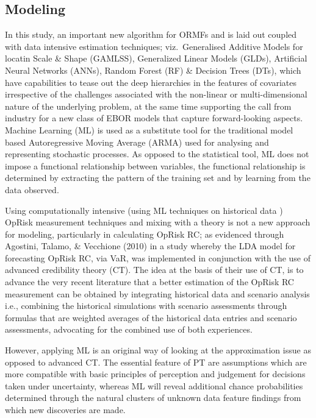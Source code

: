 \documentclass{DissertateUSU}
\begin{document}
\subsection{Modeling}

In this study, an important new algorithm for ORMFs and is laid out
coupled with data intensive estimation techniques; viz.~Generalised
Additive Models for locatin Scale \& Shape (GAMLSS), Generalized Linear
Models (GLDs), Artificial Neural Networks (ANNs), Random Forest (RF) \&
Decision Trees (DTs), which have capabilities to tease out the deep
hierarchies in the features of covariates irrespective of the challenges
associated with the non-linear or multi-dimensional nature of the
underlying problem, at the same time supporting the call from industry
for a new class of EBOR models that capture forward-looking aspects.
Machine Learning (ML) is used as a substitute tool for the traditional
model based Autoregressive Moving Average (ARMA) used for analysing and
representing stochastic processes. As opposed to the statistical tool,
ML does not impose a functional relationship between variables, the
functional relationship is determined by extracting the pattern of the
training set and by learning from the data observed.\medskip 

Using computationally intensive (using ML techniques on historical data
) OpRisk measurement techniques and mixing with a theory is not a new
approach for modeling, particularly in calculating OpRisk RC; as
evidenced through Agostini, Talamo, \& Vecchione (2010) in a study
whereby the LDA model for forecasting OpRisk RC, via VaR, was
implemented in conjunction with the use of advanced credibility theory
(CT). The idea at the basis of their use of CT, is to advance the very
recent literature that a better estimation of the OpRisk RC measurement
can be obtained by integrating historical data and scenario analysis
i.e., combining the historical simulations with scenario assessments
through formulas that are weighted averages of the historical data
entries and scenario assessments, advocating for the combined use of
both experiences.\medskip 

However, applying ML is an original way of looking at the approximation
issue as opposed to advanced CT. The essential feature of PT are
assumptions which are more compatible with basic principles of
perception and judgement for decisions taken under uncertainty, whereas
ML will reveal additional chance probabilities determined through the
natural clusters of unknown data feature findings from which new
discoveries are made.\medskip
\end{document}

